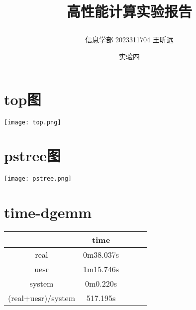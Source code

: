\documentclass{article} %
\begin{document}
    \title{\centerline{高性能计算实验报告}}
    \date{实验四}
    \author{信息学部 2023311704 王昕远}
    \maketitle
    \thispagestyle{empty}
\section{top图}%
\texttt{[image: top.png]}


\section{pstree图}
\texttt{[image: pstree.png]}




\section{time-dgemm}
\begin{tabular}{|c|c|c|c|c|}
    \hline
     & time \\ \hline
    real & 0m38.037s \\ \hline
    uesr  &1m15.746s \\ \hline
    system &0m0.220s \\ \hline
    (real+uesr)/system & 517.195s \\ \hline
\end{tabular}

$$
$$
\end{document}
